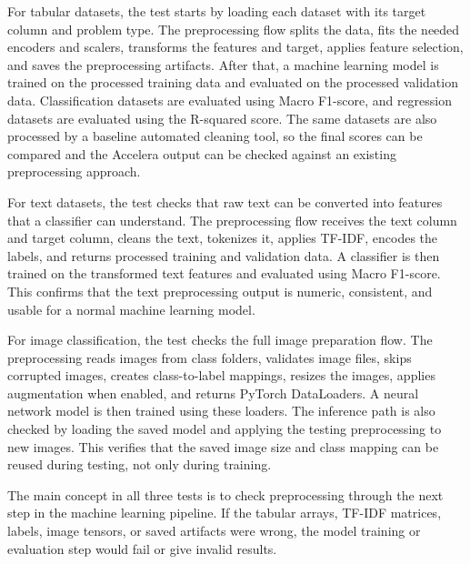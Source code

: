 \documentclass[12pt,a4paper]{report}
\begin{document}
\noindent For tabular datasets, the test starts by loading each dataset with its
target column and problem type. The preprocessing flow splits the data, fits the
needed encoders and scalers, transforms the features and target, applies feature
selection, and saves the preprocessing artifacts. After that, a machine learning
model is trained on the processed training data and evaluated on the processed
validation data. Classification datasets are evaluated using Macro F1-score,
and regression datasets are evaluated using the R-squared score. The same
datasets are also processed by a baseline automated cleaning tool, so the final
scores can be compared and the Accelera output can be checked against an
existing preprocessing approach.

\noindent For text datasets, the test checks that raw text can be converted into
features that a classifier can understand. The preprocessing flow receives the
text column and target column, cleans the text, tokenizes it, applies TF-IDF,
encodes the labels, and returns processed training and validation data. A
classifier is then trained on the transformed text features and evaluated using
Macro F1-score. This confirms that the text preprocessing output is numeric,
consistent, and usable for a normal machine learning model.

\noindent For image classification, the test checks the full image preparation
flow. The preprocessing reads images from class folders, validates image files,
skips corrupted images, creates class-to-label mappings, resizes the images,
applies augmentation when enabled, and returns PyTorch DataLoaders. A neural
network model is then trained using these loaders. The inference path is also
checked by loading the saved model and applying the testing preprocessing to new
images. This verifies that the saved image size and class mapping can be reused
during testing, not only during training.

\noindent The main concept in all three tests is to check preprocessing through
the next step in the machine learning pipeline. If the tabular arrays, TF-IDF
matrices, labels, image tensors, or saved artifacts were wrong, the model
training or evaluation step would fail or give invalid results. 
\end{document}
